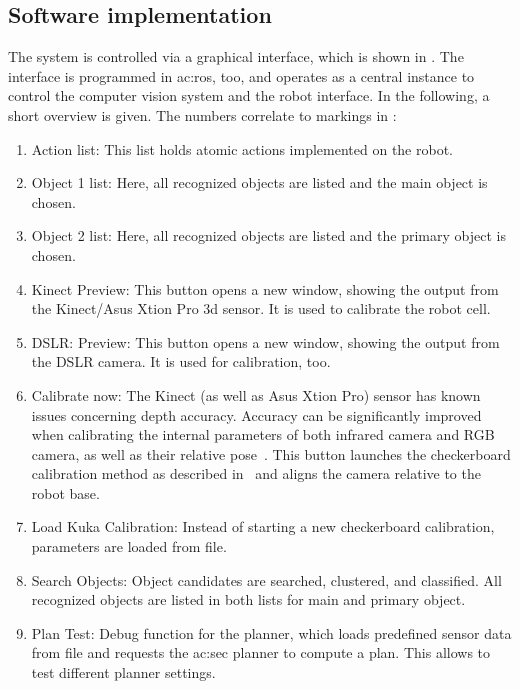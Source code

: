 \subsection{Software implementation}
\label{sec:action_methods_softwareimplementation}

The system is controlled via a graphical interface, which is shown in .
The interface is programmed in \gls{ac:ros}, too, and operates as a central instance to control the computer vision system and the robot interface.
In the following, a short overview is given.
The numbers correlate to markings in :

\begin{enumerate}
  \item Action list: This list holds atomic actions implemented on the robot.
  \item Object 1 list: Here, all recognized objects are listed and the main object is chosen.
  \item Object 2 list: Here, all recognized objects are listed and the primary object is chosen.
  \item Kinect Preview: This button opens a new window, showing the output from the Kinect/Asus Xtion Pro 3d sensor. It is used to calibrate the robot cell.
  \item DSLR: Preview: This button opens a new window, showing the output from the DSLR camera. It is used for calibration, too.
  \item Calibrate now: The Kinect (as well as Asus Xtion Pro) sensor has known issues concerning depth accuracy. Accuracy can be significantly improved when calibrating the internal parameters of both infrared camera and RGB camera, as well as their relative pose~\cite{darwish2017new}. This button launches the checkerboard calibration method as described in~\cite{darwish2017new} and aligns the camera relative to the robot base.
  \item Load Kuka Calibration: Instead of starting a new checkerboard calibration, parameters are loaded from file.
  \item Search Objects: Object candidates are searched, clustered, and classified. All recognized objects are listed in both lists for main and primary object.
  \item Plan Test: Debug function for the planner, which loads predefined sensor data from file and requests the \gls{ac:sec} planner to compute a plan. This allows to test different planner settings.

\end{enumerate}
